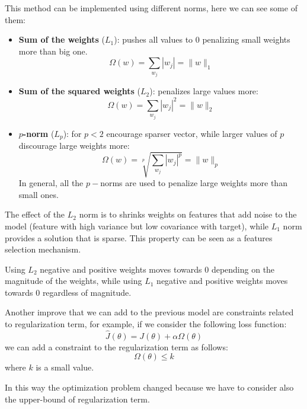 This method can be implemented using different norms, here we can see some of them:
\begin{itemize}
    \item \textbf{Sum of the weights} ($L_1$): pushes all values to $0$ penalizing
          small weights more than big one.
          \begin{equation}
              \Omega(w) = \sum_{w_j}|w_j| = \|w\|_1
          \end{equation}
    \item \textbf{Sum of the squared weights} ($L_2$): penalizes large values more:
          \begin{equation}
              \Omega(w) = \sum_{w_j}|w_j|^2 = \|w\|_2
          \end{equation}
    \item \textbf{$p$-norm} ($L_p$): for $p<2$ encourage sparser vector, while
          larger values of $p$ discourage large weights more:
          \begin{equation}
              \Omega(w) = \sqrt[p]{\sum_{w_j}|w_j|^p} = \|w\|_p
          \end{equation}
          In general, all the $p-$norms are used to penalize large weights more
          than small ones.
\end{itemize}

The effect of the $L_2$ norm is to shrinks weights on features that add noise to
the model (feature with high variance but low covariance with target), while
$L_1$ norm provides a solution that is sparse. This property can be seen as a
features selection mechanism.
\begin{note}
    Using $L_2$ negative and positive weights moves towards 0 depending on the
    magnitude of the weights, while using $L_1$ negative and positive weights
    moves towards 0 regardless of magnitude.
\end{note}

Another improve that we can add to the previous model are constraints related to
regularization term, for example, if we consider the following loss function:
\begin{equation}
    \hat{J}(\theta) = J(\theta) + \alpha \Omega(\theta)
\end{equation}
we can add a constraint to the regularization term as follows:
\begin{equation}
    \Omega(\theta) \le k
\end{equation}
where $k$ is a small value.

In this way the optimization problem changed because we have to consider also
the upper-bound of regularization term.

